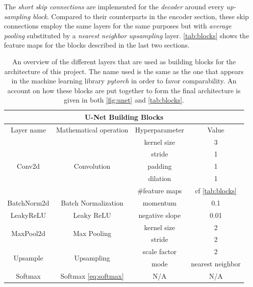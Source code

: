 The \textit{short skip connections} are implemented for the \textit{decoder} around every \textit{up-sampling block}. Compared to their counterparts in the encoder section, these skip connections employ the same layers for the same purposes but with \textit{average pooling} substituted by a \textit{nearest neighbor upsampling} layer. \cref{tab:blocks} shows the feature maps for the blocks described in the last two sections.

\begin{table}[!h]
    \centering
    \begin{tabular}{cccc}
    \hline
    \multicolumn{4}{c}{U-Net Building Blocks}\\
    \hline
    \hline
        Layer name & Mathematical operation & Hyperparameter & Value \\
        \hline
         \multirow{5}{*}{Conv2d}& \multirow{5}{*}{Convolution}& kernel size & 3 \\
         & & stride & 1  \\
         & & padding & 1  \\
         & & dilation & 1 \\
         & & \#feature maps & cf \cref{tab:blocks} \\
        \hline
        BatchNorm2d & Batch Normalization & momentum & 0.1 \\
        \hline
        LeakyReLU & Leaky ReLU & negative slope & 0.01\\
        \hline
        \multirow{2}{*}{MaxPool2d} & \multirow{2}{*}{Max Pooling} & kernel size & 2 \\
        & & stride & 2 \\
        \hline
        \multirow{2}{*}{Upsample} & \multirow{2}{*}{Upsampling} & scale factor & 2 \\
        & & mode & nearest neighbor \\
        \hline
        Softmax & Softmax \cref{eq:softmax} & N/A & N/A  \\
        \hline
    \end{tabular}
    \caption{An overview of the different layers that are used as building blocks for the architecture of this project. The name used is the same as the one that appears in the machine learning library \textit{pytorch} in order to favor comparability. An account on how these blocks are put together to form the final architecture is given in both \cref{fig:unet} and \cref{tab:blocks}.}
    \label{tab:architecture}
\end{table}

